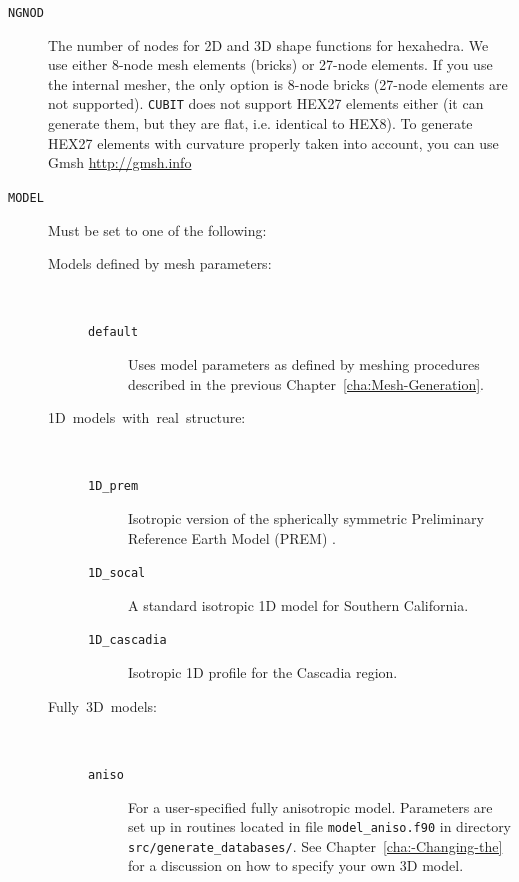 \vspace{1cm}
\begin{description}
\item [{\texttt{NGNOD}}] The number of nodes for 2D and 3D shape functions
for hexahedra. We use either 8-node mesh elements (bricks) or 27-node
elements. If you use the internal mesher, the only option is 8-node
bricks (27-node elements are not supported). \texttt{CUBIT} does not
support HEX27 elements either (it can generate them, but they are
flat, i.e. identical to HEX8). To generate HEX27 elements with curvature
properly taken into account, you can use Gmsh \url{http://gmsh.info}
%
\item [{\texttt{MODEL}}] Must be set to one of the following:

\begin{description}
\item [{\textmd{Models defined by mesh parameters:}}] ~

\begin{description}
\item [{\texttt{default}}] Uses model parameters as defined by meshing
procedures described in the previous Chapter~\ref{cha:Mesh-Generation}.
\end{description}

\item [{\textmd{1D~models~with~real~structure:}}] ~

\begin{description}
\item [{\texttt{1D\_prem}}] Isotropic version of the spherically symmetric
Preliminary Reference Earth Model (PREM) \citep{DzAn81}.
\item [{\texttt{1D\_socal}}] A standard isotropic 1D model for Southern
California.
\item [{\texttt{1D\_cascadia}}] Isotropic 1D profile for the Cascadia region.
\end{description}

\item [{\textmd{Fully~3D~models:}}] ~

\begin{description}
\item [{\texttt{aniso}}] For a user-specified fully anisotropic model.
Parameters are set up in routines located in file \texttt{model\_aniso.f90}
in directory \texttt{src/generate\_databases/}. See Chapter~\ref{cha:-Changing-the}
for a discussion on how to specify your own 3D model.


\end{description}
\end{description}
\end{description}
